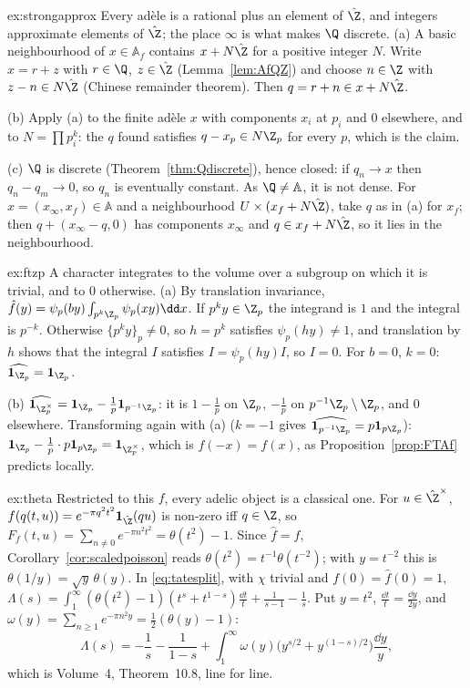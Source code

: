 \begin{solution}{ex:strongapprox}
\idea Every ad\`ele is a rational plus an element of $\hat{\Z}$, and integers approximate elements of $\hat{\Z}$; the place $\infty$ is what makes $\Q$ discrete.
\writeup (a) A basic neighbourhood of $x\in\mathbb{A}_f$ contains $x+N\hat{\Z}$ for a positive integer $N$. Write $x=r+z$ with $r\in\Q$, $z\in\hat{\Z}$
(Lemma~\ref{lem:AfQZ}) and choose $n\in\Z$ with $z-n\in N\hat{\Z}$ (Chinese remainder theorem). Then $q=r+n\in x+N\hat{\Z}$.

(b) Apply (a) to the finite ad\`ele $x$ with components $x_i$ at $p_i$ and $0$ elsewhere, and to $N=\prod p_i^k$: the $q$ found satisfies
$q-x_{p}\in N\Z_p$ for every $p$, which is the claim.

(c) $\Q$ is discrete (Theorem~\ref{thm:Qdiscrete}), hence closed: if $q_n\to x$ then $q_n-q_m\to0$, so $q_n$ is eventually constant. As $\Q\ne\mathbb{A}$, it is not
dense. For $x=(x_\infty,x_f)\in\mathbb{A}$ and a neighbourhood $U\times(x_f+N\hat{\Z})$, take $q$ as in (a) for $x_f$; then $q+(x_\infty-q,0)$ has components $x_\infty$
and $q\in x_f+N\hat{\Z}$, so it lies in the neighbourhood.
\end{solution}

\begin{solution}{ex:ftzp}
\idea A character integrates to the volume over a subgroup on which it is trivial, and to $0$ otherwise.
\writeup (a) By translation invariance, $\hat f(y)=\psi_p(by)\int_{p^k\Z_p}\psi_p(xy)\dd x$. If $p^ky\in\Z_p$ the integrand is $1$ and the integral is $p^{-k}$.
Otherwise $\{p^ky\}_p\ne0$, so $h=p^k$ satisfies $\psi_p(hy)\ne1$, and translation by $h$ shows that the integral $I$ satisfies $I=\psi_p(hy)I$, so $I=0$. For
$b=0$, $k=0$: $\widehat{\mathbf 1_{\Z_p}}=\mathbf 1_{\Z_p}$.

(b) $\widehat{\mathbf 1_{\Z_p^\times}}=\mathbf 1_{\Z_p}-\frac1p\mathbf 1_{p^{-1}\Z_p}$: it is $1-\frac1p$ on $\Z_p$, $-\frac1p$ on $p^{-1}\Z_p\setminus\Z_p$, and $0$ elsewhere.
Transforming again with (a) ($k=-1$ gives $\widehat{\mathbf 1_{p^{-1}\Z_p}}=p\mathbf 1_{p\Z_p}$): $\mathbf 1_{\Z_p}-\frac1p\cdot p\mathbf 1_{p\Z_p}=\mathbf 1_{\Z_p^\times}$, which is
$f(-x)=f(x)$, as Proposition~\ref{prop:FTAf} predicts locally.
\end{solution}

\begin{solution}{ex:theta}
\idea Restricted to this $f$, every adelic object is a classical one.
\writeup For $u\in\hat{\Z}^\times$, $f(q(t,u))=e^{-\pi q^2t^2}\mathbf 1_{\hat{\Z}}(qu)$ is non-zero iff $q\in\Z$, so $F_f(t,u)=\sum_{n\ne0}e^{-\pi n^2t^2}=\theta(t^2)-1$.
Since $\hat f=f$, Corollary~\ref{cor:scaledpoisson} reads $\theta(t^2)=t^{-1}\theta(t^{-2})$; with $y=t^{-2}$ this is $\theta(1/y)=\sqrt y\,\theta(y)$. In
\eqref{eq:tatesplit}, with $\chi$ trivial and $f(0)=\hat f(0)=1$, $\Lambda(s)=\int_1^\infty(\theta(t^2)-1)(t^s+t^{1-s})\frac{\dd t}t+\frac1{s-1}-\frac1s$. Put $y=t^2$,
$\frac{\dd t}t=\frac{\dd y}{2y}$, and $\omega(y)=\sum_{n\ge1}e^{-\pi n^2y}=\frac12(\theta(y)-1)$:
\[
\Lambda(s)=-\frac1s-\frac1{1-s}+\int_1^\infty\omega(y)\bigl(y^{s/2}+y^{(1-s)/2}\bigr)\frac{\dd y}y,
\]
which is Volume~4, Theorem~10.8, line for line.
\end{solution}


